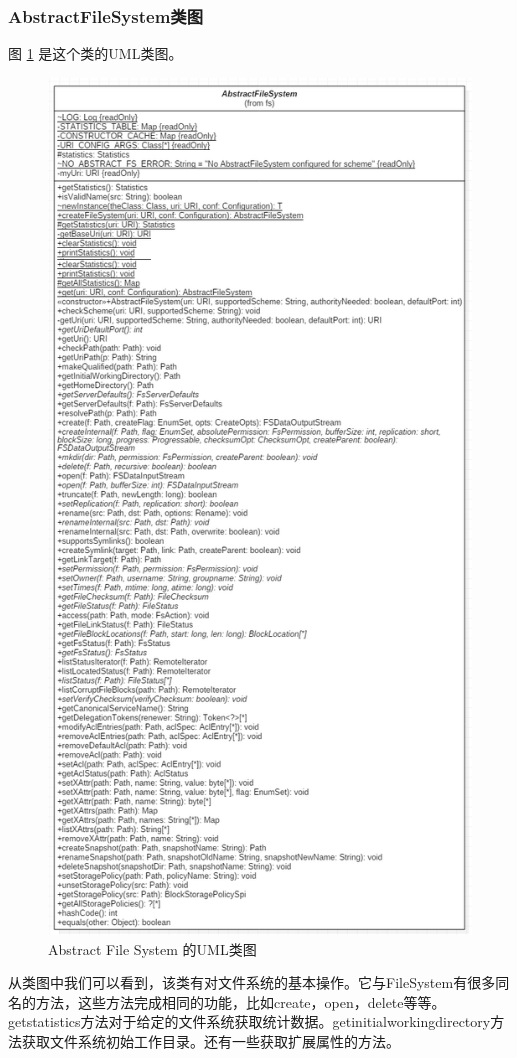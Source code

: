 \subsubsection{AbstractFileSystem类图}
图 \ref{fig:abstractFileSystem} 是这个类的UML类图。
\begin{figure}
\centering
\includegraphics[width=1\linewidth]{UML/abstractfilesystem/abstractFileSystem.PNG}
\caption{Abstract File System 的UML类图}
\label{fig:abstractFileSystem}
\end{figure}
从类图中我们可以看到，该类有对文件系统的基本操作。它与FileSystem有很多同名的方法，这些方法完成相同的功能，比如create，open，delete等等。getstatistics方法对于给定的文件系统获取统计数据。getinitialworkingdirectory方法获取文件系统初始工作目录。还有一些获取扩展属性的方法。

